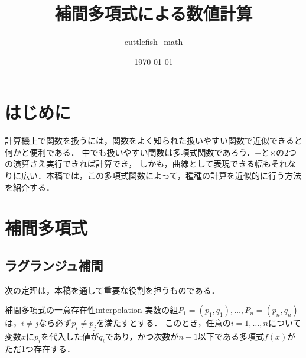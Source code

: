 \documentclass[a4paper]{ltjsarticle}
\title{補間多項式による数値計算}
\author{cuttlefish\_math}
\date{\today}
\theoremstyle{definition}
\begin{document}
\maketitle
\tableofcontents

\section{はじめに}
計算機上で関数を扱うには，関数をよく知られた扱いやすい関数で近似できると何かと便利である．
中でも扱いやすい関数は多項式関数であろう．$+$と$\times$の2つの演算さえ実行できれば計算でき，
しかも，曲線として表現できる幅もそれなりに広い．本稿では，この多項式関数によって，種種の計算を近似的に行う方法を紹介する．

\section{補間多項式}
\subsection{ラグランジュ補間}
次の定理は，本稿を通して重要な役割を担うものである．

\begin{theorem}{補間多項式の一意存在性}{interpolation}
  実数の組$P_1 = (p_1, q_1), \dots, P_n = (p_n, q_n)$は，$i \neq j$なら必ず$p_i \neq p_j$を満たすとする．
  このとき，任意の$i = 1,\dots,n$について変数$x$に$p_i$を代入した値が$q_i$であり，かつ次数が$n-1$以下である多項式$f(x)$がただ1つ存在する．
\end{theorem}
\end{document}
